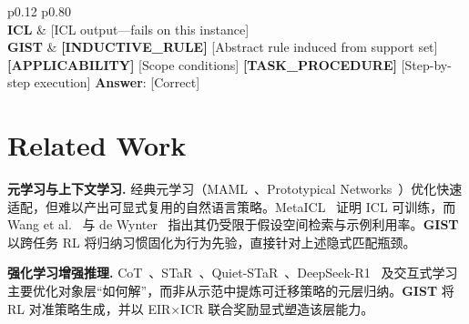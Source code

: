 \documentclass[11pt]{article}
\newcommand{\gist}{\textbf{GIST}}
\begin{document}
\begin{table}[h!]
  \centering
  \small
  \setlength{\tabcolsep}{5pt}
  \renewcommand{\arraystretch}{1.12}
  \begin{tabular}{p{} p{}}
    \toprule
     \\
    \midrule
    \textbf{ICL} & [ICL output---fails on this instance] \\
    \midrule
    \textbf{\gist{}} &
      \textbf{[INDUCTIVE\_RULE]} [Abstract rule induced from support set] \newline
      \textbf{[APPLICABILITY]} [Scope conditions] \newline
      \textbf{[TASK\_PROCEDURE]} [Step-by-step execution] \newline
      \textbf{Answer}: [Correct] \\
    \bottomrule
  \end{tabular}
  \caption{Qualitative comparison on an OOD task. ICL relies on surface pattern matching and fails; \gist{} induces an abstract rule and applies it step by step, yielding interpretable reasoning. App.~G provides a failure case analysis.}
  \label{tab:case_study}
\end{table}


\section{Related Work}
\label{sec:related}

\textbf{元学习与上下文学习.} 经典元学习（MAML~\citep{finn2017maml}、Prototypical Networks~\citep{snell2017prototypical}）优化快速适配，但难以产出可显式复用的自然语言策略。MetaICL~\citep{min2022metaicl} 证明 ICL 可训练，而 Wang et al.~\citep{wang2024icl_ood} 与 de Wynter~\citep{dewynter2025icl} 指出其仍受限于假设空间检索与示例利用率。\gist{} 以跨任务 RL 将归纳习惯固化为行为先验，直接针对上述隐式匹配瓶颈。

\textbf{强化学习增强推理.} CoT~\citep{wei2022cot}、STaR~\citep{zelikman2022star}、Quiet-STaR~\citep{zelikman2024quietstar}、DeepSeek-R1~\citep{deepseek2025r1} 及交互式学习~\citep{klissarov2026interactive} 主要优化对象层“如何解”，而非从示范中提炼可迁移策略的元层归纳。\gist{} 将 RL 对准策略生成，并以 EIR$\times$ICR 联合奖励显式塑造该层能力。
\end{document}

